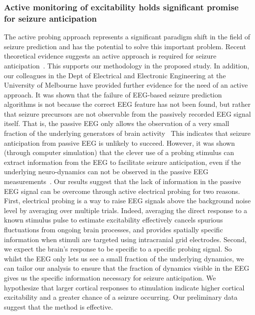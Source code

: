 \documentclass[]{article}
\begin{document}
\subsubsection{Active monitoring of excitability holds significant promise for seizure anticipation}
The active probing approach represents a significant paradigm shift in the field of seizure prediction and has the potential to solve this important problem. Recent theoretical evidence suggests an active approach is required for seizure anticipation~\cite{Suffczynski2008}. This supports our methodology in the proposed study. In addition, our colleagues in the Dept of Electrical and Electronic Engineering at the University of Melbourne have provided further evidence for the need of an active approach. It was shown that the failure of EEG-based seizure prediction algorithms is not because the correct EEG feature has not been found, but rather that seizure precursors are not observable from the passively recorded EEG signal itself.  That is, the passive EEG only allows the observation of a very small fraction of the underlying generators of brain activity~\cite{O'Sullivan-Greene2009,O'Sullivan-Greene2009a} This indicates that seizure anticipation from passive EEG is unlikely to succeed. However, it was shown (through computer simulation) that the clever use of a probing stimulus can extract information from the EEG to facilitate seizure anticipation, even if the underlying neuro-dynamics can not be observed in the passive EEG measurements~\cite{O'Sullivan-Greene2009a}. 
Our results suggest that the lack of information in the passive EEG signal can be overcome through active electrical probing for two reasons. First, electrical probing is a way to raise EEG signals above the background noise level by averaging over multiple trials. Indeed, averaging the direct response to a known stimulus pulse to estimate excitability effectively cancels spurious fluctuations from ongoing brain processes, and provides spatially specific information when stimuli are targeted using intracranial grid electrodes. Second, we expect the brain’s response to be specific to a specific probing signal.  So whilst the EEG only lets us see a small fraction of the underlying dynamics, we can tailor our analysis to ensure that the fraction of dynamics visible in the EEG gives us the specific information necessary for seizure anticipation.
We hypothesize that larger cortical responses to stimulation indicate higher cortical excitability and a greater chance of a seizure occurring. Our preliminary data suggest that the method is effective.
\end{document}
